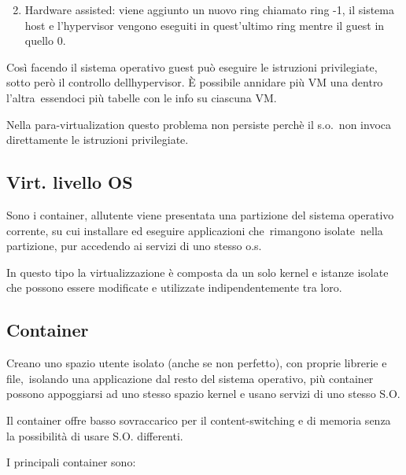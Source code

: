 \documentclass[
]{article}
\providecommand{\tightlist}{%
  \setlength{\itemsep}{0pt}\setlength{\parskip}{0pt}}
\begin{document}
{}

\begin{enumerate}
\setcounter{enumi}{1}
\tightlist
\item
  {Hardware assisted}{: viene aggiunto un nuovo ring chiamato }{ring
  -1}{, il sistema host e l'hypervisor vengono eseguiti in quest'ultimo
  ring mentre il guest in quello 0.}
\end{enumerate}

{Così facendo il sistema operativo guest può eseguire le istruzioni
privilegiate, sotto però il controllo dell\textquotesingle hypervisor.
}{È possibile annidare più VM una dentro l'altra}{~essendoci più tabelle
con le info su ciascuna VM.}

{}

{Nella para-virtualization questo problema non persiste perchè il
}{s.o.}{~non invoca direttamente le istruzioni privilegiate.}

{}

{}

\subsection{\texorpdfstring{{Virt. livello
OS}}{Virt. livello OS}}\label{h.exro2jxs3nps}

{Sono i container, all\textquotesingle utente viene presentata una
partizione del sistema operativo corrente, su cui installare ed eseguire
applicazioni che}{~rimangono isolate}{~nella partizione, }{pur accedendo
ai servizi di uno stesso }{o.s}{.}

{In questo tipo la virtualizzazione è composta da un solo kernel e
istanze isolate che possono essere modificate e utilizzate
indipendentemente tra loro.}

{}

\subsection{\texorpdfstring{{Container}}{Container}}\label{h.la4f4eujhkv6}

{Creano uno spazio utente isolato (anche se non perfetto), con proprie
librerie e }{file,}{~isolando una applicazione dal resto del sistema
operativo, più container possono appoggiarsi ad uno stesso spazio kernel
e }{usano servizi di uno stesso S.O.}

{Il container offre basso sovraccarico per il content-switching e di
memoria senza la possibilità di usare S.O. differenti.}

{I principali container sono: }
\end{document}
